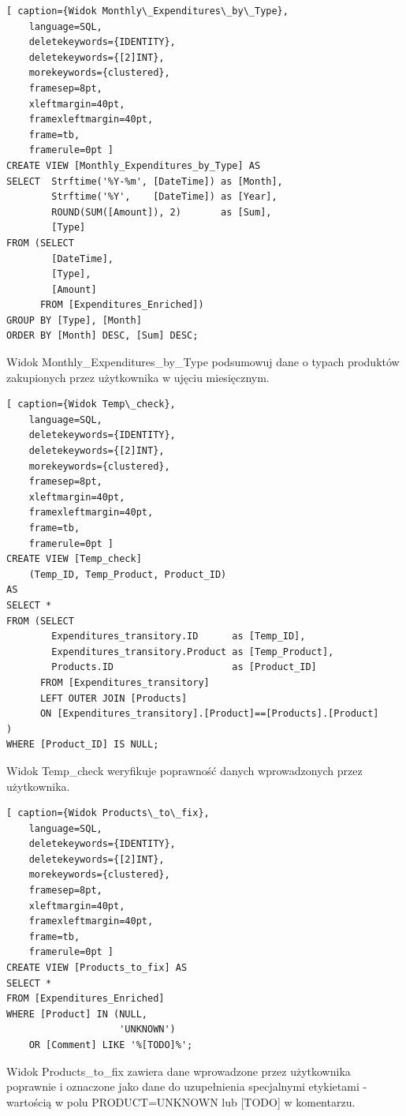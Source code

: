 \documentclass[a4paper,10pt, twoside]{report}
\begin{document}
\begin{minipage}{\textwidth}
\begin{lstlisting}[ caption={Widok Monthly\_Expenditures\_by\_Type},
    language=SQL,
    deletekeywords={IDENTITY},
    deletekeywords={[2]INT},
    morekeywords={clustered},
    framesep=8pt,
    xleftmargin=40pt,
    framexleftmargin=40pt,
    frame=tb,
    framerule=0pt ]
CREATE VIEW [Monthly_Expenditures_by_Type] AS 
SELECT	Strftime('%Y-%m', [DateTime]) as [Month],
        Strftime('%Y',    [DateTime]) as [Year],
        ROUND(SUM([Amount]), 2)       as [Sum],
        [Type]
FROM (SELECT 
        [DateTime], 
        [Type], 
        [Amount] 
      FROM [Expenditures_Enriched])
GROUP BY [Type], [Month]
ORDER BY [Month] DESC, [Sum] DESC;
\end{lstlisting}
{Widok Monthly\_Expenditures\_by\_Type podsumowuj dane o typach produktów 
zakupionych przez użytkownika w ujęciu miesięcznym.}
\end{minipage}

\begin{minipage}{\textwidth}
\begin{lstlisting}[ caption={Widok Temp\_check},
    language=SQL,
    deletekeywords={IDENTITY},
    deletekeywords={[2]INT},
    morekeywords={clustered},
    framesep=8pt,
    xleftmargin=40pt,
    framexleftmargin=40pt,
    frame=tb,
    framerule=0pt ]
CREATE VIEW [Temp_check] 
    (Temp_ID, Temp_Product, Product_ID)
AS
SELECT *
FROM (SELECT 
        Expenditures_transitory.ID      as [Temp_ID],
        Expenditures_transitory.Product as [Temp_Product],
        Products.ID                     as [Product_ID]
      FROM [Expenditures_transitory]
      LEFT OUTER JOIN [Products]
      ON [Expenditures_transitory].[Product]==[Products].[Product]
)
WHERE [Product_ID] IS NULL;
\end{lstlisting}
{Widok Temp\_check weryfikuje poprawność danych wprowadzonych przez użytkownika.}
\end{minipage}

\begin{minipage}{\textwidth}
\begin{lstlisting}[ caption={Widok Products\_to\_fix},
    language=SQL,
    deletekeywords={IDENTITY},
    deletekeywords={[2]INT},
    morekeywords={clustered},
    framesep=8pt,
    xleftmargin=40pt,
    framexleftmargin=40pt,
    frame=tb,
    framerule=0pt ]
CREATE VIEW [Products_to_fix] AS
SELECT *
FROM [Expenditures_Enriched]
WHERE [Product] IN (NULL,
                    'UNKNOWN')
    OR [Comment] LIKE '%[TODO]%';
\end{lstlisting}
{Widok Products\_to\_fix zawiera dane wprowadzone przez użytkownika poprawnie i 
oznaczone jako dane do uzupełnienia specjalnymi etykietami - wartością w polu 
PRODUCT=UNKNOWN lub [TODO] w komentarzu.}
\end{minipage}
\end{document}
